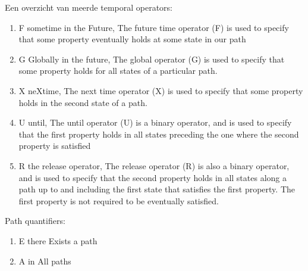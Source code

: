 \documentclass{article}
\begin{document}
	Een overzicht van meerde temporal operators:
	\begin{enumerate}
		\item F sometime in the Future, The future time operator (F) is used to specify
		that some property eventually holds at some
		state in our path
		\item G Globally in the future, The global operator (G) is used to specify that
		some property holds for all states of a particular path.
		\item X neXtime, The next time operator (X) is used to specify
		that some property holds in the second state
		of a path.
		\item U until, The until operator (U) is a binary operator,
		and is used to specify that the first property
		holds in all states preceding the one where the
		second property is satisfied
		\item R the release operator, The release operator (R) is also a binary operator, and is used to specify that the second
		property holds in all states along a path up to
		and including the first state that satisfies the
		first property. The first property is not required
		to be eventually satisfied.
	\end{enumerate}
	Path quantifiers: 
	\begin{enumerate}
		\item E there Exists a path
		\item A in All paths
		
	\end{enumerate}
	
\end{document}
